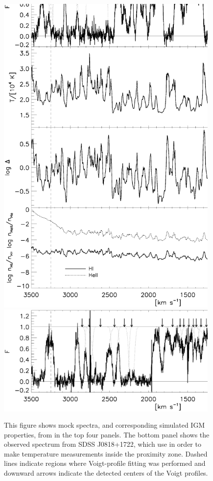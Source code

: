 \begin{figure}[!p]
  \centering
  \includegraphics[width=11cm]{BoltonIGMTemperature_Fig2.ps}
  \includegraphics[width=11cm]{BoltonIGMTemperature_Fig2b.ps}
  \caption{This figure shows mock spectra, and corresponding simulated IGM properties, from \citet{BoltonQuasar} in the top four panels. The bottom panel shows the observed spectrum from SDSS J0818+1722, which \citet{BoltonQuasar} use in order to make temperature measurements inside the proximity zone. Dashed lines indicate regions where Voigt-profile fitting was performed and downward arrows indicate the detected centers of the Voigt profiles.}
  \label{fig:QuasarProximityTemp}
\end{figure}

